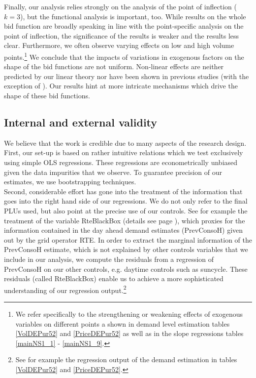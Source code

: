 

Finally, our analysis relies strongly on the analysis of the point of inflection ($k=3$), but the functional analysis is important, too. While results on the whole bid function are broadly speaking in line with the point-specific analysis on the point of inflection, the significance of the results is weaker and the results less clear. Furthermore, we often observe varying effects on low and high volume points.\footnote{We refer specifically to the strengthening or weakening effects of exogenous variables on different points a shown in demand level estimation tables \ref{VolDEPur52} and \ref{PriceDEPur52}  as well as in the slope regressions tables \ref{mainNS1_1} - \ref{mainNS1_9}.}
We conclude that the impacts of variations in exogenous factors on the shape of the bid functions are not uniform. Non-linear effects are neither predicted by our linear theory nor have been shown in previous studies (with the exception of \cite{wolfram1999measuring}). Our results hint at more intricate mechanisms which drive the shape of these bid functions. 


\subsection{Internal and external validity}
\label{internal}

We believe that the work is credible due to many aspects of the research design. \\

First, our set-up is based on rather intuitive relations which we test exclusively using simple OLS regressions. These regressions are econometrically unbiased given the data impurities that we observe. To guarantee precision of our estimates, we use bootstrapping techniques.\\ 

Second, considerable effort has gone into the treatment of the information that goes into the right hand side of our regressions. We do not only refer to the final PLUs used, but also point at the precise use of our controls. See for example the treatment of the variable RteBlackBox (details see page \pageref{RteBlackBox}), which proxies for the information contained in the day ahead demand estimates (PrevConsoH) given out by the grid operator RTE. In order to extract the marginal information of the PrevConsoH estimate, which is not explained by other controls variables that we include in our analysis, we compute the residuals from a regression of PrevConsoH on our other controls, e.g. daytime controls such as suncycle. These residuals (called RteBlackBox) enable us to achieve a more sophisticated understanding of our regression output.\footnote{See for example the regression output of the demand estimation in tables \ref{VolDEPur52} and \ref{PriceDEPur52}.}\\


